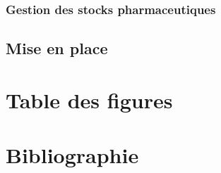 \documentclass[12pt]{article}
\begin{document}
\subsubsection{Gestion des stocks pharmaceutiques}



\subsection{Mise en place}

\newpage


\section*{Table des figures}
\makeatletter
{}%
\makeatother
{}%


\nocite{*}
\section*{Bibliographie}
\printbibliography[heading=none]
%

\end{document}
